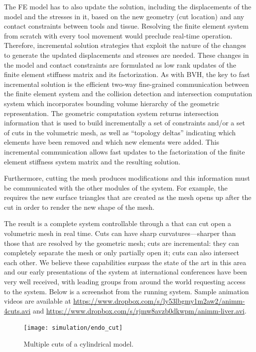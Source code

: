 The FE model has to also update the solution, including the displacements of the model and the stresses in it, based on the new geometry (cut location) and any contact constraints between tools and tissue. Resolving the finite element system from scratch with every tool movement would preclude real-time operation. Therefore, incremental solution strategies that exploit the nature of the changes to generate the updated displacements and stresses are needed. These changes in the model and contact constraints are formulated as low rank updates of the finite element stiffness matrix and its factorization. As with BVH, the key to fast incremental solution is the efficient two-way fine-grained communication between the finite element system and the collision detection and intersection computation system which incorporates bounding volume hierarchy of the geometric representation. The geometric computation system returns intersection information that is used to build incrementally a set of constraints and/or a set of cuts in the volumetric mesh, as well as \enquote{topology deltas} indicating which elements have been removed and which new elements were added. This incremental communication allows fast updates to the factorization of the finite element stiffness system matrix
 and the resulting solution. 

Furthermore, cutting the mesh produces modifications and this information must be communicated with the other modules of the system. 
For example, the  requires the new surface triangles that are created as the mesh opens up after the cut in order to render the new shape of the mesh. 

The result is a complete system controllable through a  that can cut open a volumetric mesh in real time. Cuts can have sharp curvatures---sharper than those that are resolved by the geometric mesh; cuts are incremental: they can completely separate the  mesh or only partially open it; cuts can also intersect each other. We believe these capabilities surpass the state of the art in this area and our early presentations of the system at international conferences have been very well received, with leading groups from around the world requesting access to the system. Below is a screenshot from the running system. Sample animation videos are available at \url{https://www.dropbox.com/s/ly53lbgmy1m2aw2/animm-4cuts.avi} and \url{https://www.dropbox.com/s/rjmw8avzb0dkwpm/animm-liver.avi}.

\begin{figure}
	\centering%
	\texttt{[image: simulation/endo\_cut]}
	\caption{Multiple cuts of a cylindrical model.}
	\label{fig:endo_cut}
\end{figure}

